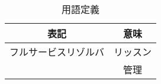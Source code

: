 \begin{table}[htb]
 \centering
  \begin{tabular}{cc}
    \toprule
    表記 & 意味 \\
    \midrule
    フルサービスリゾルバ & リッスン \\
     &  管理
    \bottomrule
  \end{tabular}
 \label{tab:service}
 \caption{用語定義}
\end{table}

